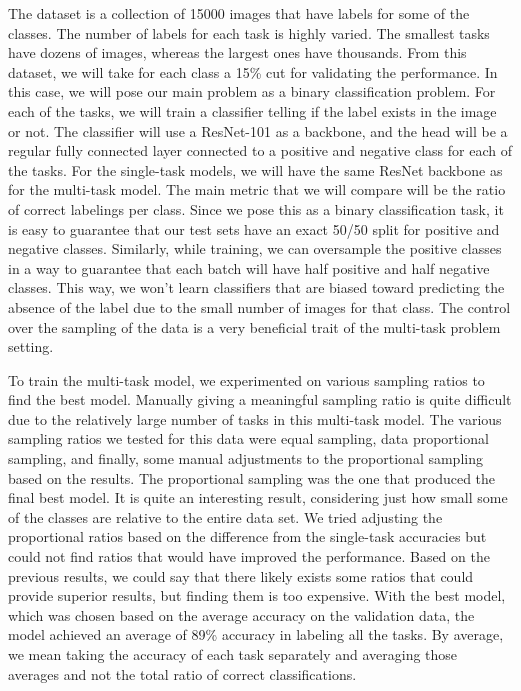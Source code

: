 The dataset is a collection of 15000 images that have labels for some of the classes.
The number of labels for each task is highly varied.
The smallest tasks have dozens of images, whereas the largest ones have thousands.
From this dataset, we will take for each class a 15\% cut for validating the performance.
In this case, we will pose our main problem as a binary classification problem.
For each of the tasks, we will train a classifier telling if the label exists in the image or not.
The classifier will use a ResNet-101 as a backbone, and the head will be a regular fully connected layer connected to a positive and negative class for each of the tasks.
For the single-task models, we will have the same ResNet backbone as for the multi-task model.
The main metric that we will compare will be the ratio of correct labelings per class.
Since we pose this as a binary classification task, it is easy to guarantee that our test sets have an exact 50/50 split for positive and negative classes.
Similarly, while training, we can oversample the positive classes in a way to guarantee that each batch will have half positive and half negative classes.
This way, we won't learn classifiers that are biased toward predicting the absence of the label due to the small number of images for that class.
The control over the sampling of the data is a very beneficial trait of the multi-task problem setting.

To train the multi-task model, we experimented on various sampling ratios to find the best model.
Manually giving a meaningful sampling ratio is quite difficult due to the relatively large number of tasks in this multi-task model.
The various sampling ratios we tested for this data were equal sampling, data proportional sampling, and finally, some manual adjustments to the proportional sampling based on the results.
The proportional sampling was the one that produced the final best model.
It is quite an interesting result, considering just how small some of the classes are relative to the entire data set.
We tried adjusting the proportional ratios based on the difference from the single-task accuracies but could not find ratios that would have improved the performance.
Based on the previous results, we could say that there likely exists some ratios that could provide superior results, but finding them is too expensive.
With the best model, which was chosen based on the average accuracy on the validation data, the model achieved an average of 89\% accuracy in labeling all the tasks.
By average, we mean taking the accuracy of each task separately and averaging those averages and not the total ratio of correct classifications.


